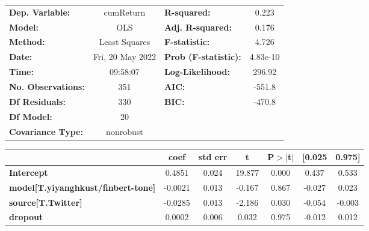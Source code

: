 \begin{center}
\begin{tabular}{lclc}
\toprule
\textbf{Dep. Variable:}                    &    cumReturn     & \textbf{  R-squared:         } &     0.223   \\
\textbf{Model:}                            &       OLS        & \textbf{  Adj. R-squared:    } &     0.176   \\
\textbf{Method:}                           &  Least Squares   & \textbf{  F-statistic:       } &     4.726   \\
\textbf{Date:}                             & Fri, 20 May 2022 & \textbf{  Prob (F-statistic):} &  4.83e-10   \\
\textbf{Time:}                             &     09:58:07     & \textbf{  Log-Likelihood:    } &    296.92   \\
\textbf{No. Observations:}                 &         351      & \textbf{  AIC:               } &    -551.8   \\
\textbf{Df Residuals:}                     &         330      & \textbf{  BIC:               } &    -470.8   \\
\textbf{Df Model:}                         &          20      & \textbf{                     } &             \\
\textbf{Covariance Type:}                  &    nonrobust     & \textbf{                     } &             \\
\bottomrule
\end{tabular}
\begin{tabular}{lcccccc}
                                           & \textbf{coef} & \textbf{std err} & \textbf{t} & \textbf{P$> |$t$|$} & \textbf{[0.025} & \textbf{0.975]}  \\
\midrule
\textbf{Intercept}                         &       0.4851  &        0.024     &    19.877  &         0.000        &        0.437    &        0.533     \\
\textbf{model[T.yiyanghkust/finbert-tone]} &      -0.0021  &        0.013     &    -0.167  &         0.867        &       -0.027    &        0.023     \\
\textbf{source[T.Twitter]}                 &      -0.0285  &        0.013     &    -2.186  &         0.030        &       -0.054    &       -0.003     \\
\textbf{dropout}                           &       0.0002  &        0.006     &     0.032  &         0.975        &       -0.012    &        0.012     \\

\end{tabular}
\end{center}
